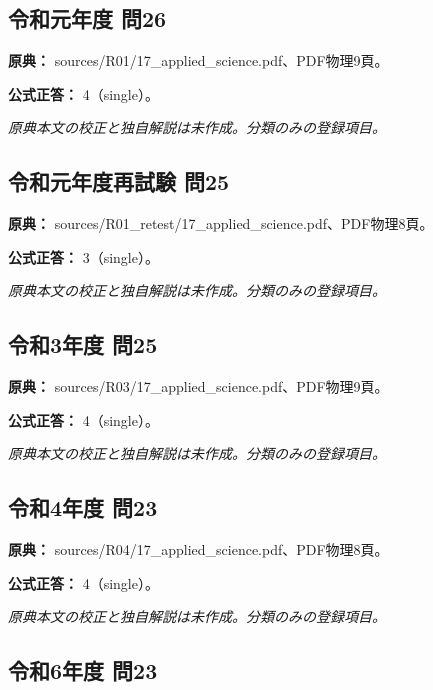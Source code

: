 \subsection{令和元年度 問26}
\label{q:r01-reg-applied-26}

\noindent\textbf{原典：} sources/R01/17\_applied\_science.pdf、PDF物理9頁。

\textbf{公式正答：} 4（single）。

\par\textit{原典本文の校正と独自解説は未作成。分類のみの登録項目。}

\subsection{令和元年度再試験 問25}
\label{q:r01-ret-applied-25}

\noindent\textbf{原典：} sources/R01\_retest/17\_applied\_science.pdf、PDF物理8頁。

\textbf{公式正答：} 3（single）。

\par\textit{原典本文の校正と独自解説は未作成。分類のみの登録項目。}

\subsection{令和3年度 問25}
\label{q:r03-reg-applied-25}

\noindent\textbf{原典：} sources/R03/17\_applied\_science.pdf、PDF物理9頁。

\textbf{公式正答：} 4（single）。

\par\textit{原典本文の校正と独自解説は未作成。分類のみの登録項目。}

\subsection{令和4年度 問23}
\label{q:r04-reg-applied-23}

\noindent\textbf{原典：} sources/R04/17\_applied\_science.pdf、PDF物理8頁。

\textbf{公式正答：} 4（single）。

\par\textit{原典本文の校正と独自解説は未作成。分類のみの登録項目。}

\subsection{令和6年度 問23}
\label{q:r06-reg-applied-23}

